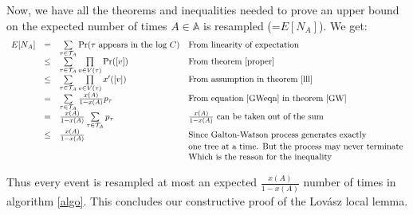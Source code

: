 Now, we have all the theorems and inequalities needed to prove an upper bound on the expected number of times $A\in\mathbb{A}$ is resampled (=$E[N_A]$). We get:
\[
 \begin{array}{rcll}
  E[N_A] & = & \sum\limits_{\tau\in\mathcal{T}_A} \Pr(\tau\text{ appears in the log }C) & \text{From linearity of expectation}\\
  & \leq & \sum\limits_{\tau\in\mathcal{T}_A}\prod\limits_{v\in V(\tau) } \Pr([v]) & \text{From theorem \ref{proper}} \\
  & \leq & \sum\limits_{\tau\in\mathcal{T}_A}\prod\limits_{v\in V(\tau) }x'([v]) & \text{From assumption in theorem \ref{lll}} \\
  & = & \sum\limits_{\tau\in\mathcal{T}_A} \frac{x(A)}{1-x(A) }p_\tau & \text{From equation \ref{GWeqn} in theorem \ref{GW}} \\
  & = & \frac{x(A)}{1-x(A) } \sum\limits_{\tau\in\mathcal{T}_A}p_\tau & \frac{x(A)}{1-x(A)} \text{ can be taken out of the sum} \\
  & \leq & \frac{x(A)}{1-x(A) } & \text{Since Galton-Watson process generates exactly}\\
  & & & \text{one tree at a time. But the process may never terminate}\\
  & & & \text{Which is the reason for the inequality}
 \end{array}
\]

Thus every event is resampled at most an expected $\frac{x(A)}{1-x(A) } $ number of times in algorithm \ref{algo}. This concludes our constructive proof of the Lov\'asz local lemma.